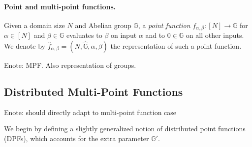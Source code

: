 \documentclass[sigconf]{acmart}
\newcommand{\Enote}[1]{\color{purple}Enote: #1\color{black}}
\newcommand{\GG}{\mathbb{G}}
\begin{document}
 \paragraph{Point and multi-point functions.} Given a domain size $N$ and Abelian group $\GG$, a \emph{point function} $f_{\alpha,\beta}:[N]\rightarrow\GG$ for $\alpha\in[N]$ and $\beta\in\GG$ evaluates to $\beta$ on input $\alpha$ and to $0\in\GG$ on all other inputs. We denote by $\hat{f}_{\alpha,\beta}=(N,\hat{\GG},\alpha,\beta)$ the representation of such a point function.
 
\Enote{MPF. Also representation of groups.}
 
\subsection{Distributed Multi-Point Functions}

\Enote{should directly adapt to multi-point function case}

We begin by defining a slightly generalized notion of distributed point functions (DPFs), which accounts for the extra parameter $\GG'$.
\end{document}
